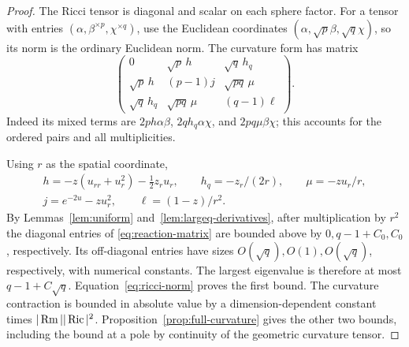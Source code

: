 \begin{proof}
The Ricci tensor is diagonal and scalar on each sphere factor. For a tensor
with entries \((\alpha,\beta^{\times p},\chi^{\times q})\), use the
Euclidean coordinates \((\alpha,\sqrt p\beta,\sqrt q\chi)\), so its
norm is the ordinary Euclidean norm. The curvature form has matrix
\begin{equation}\label{eq:reaction-matrix}
\begin{pmatrix}
0&\sqrt p\,h&\sqrt q\,h_q\\
\sqrt p\,h&(p-1)j&\sqrt{pq}\,\mu\\
\sqrt q\,h_q&\sqrt{pq}\,\mu&(q-1)\ell
\end{pmatrix}.
\end{equation}
Indeed its mixed terms are \(2ph\alpha\beta\),
\(2qh_q\alpha\chi\), and \(2pq\mu\beta\chi\); this accounts for
the ordered pairs and all multiplicities.

Using \(r\) as the spatial coordinate,
\begin{equation}\label{eq:curv-sideways}
\begin{gathered}
h=-z(u_{rr}+u_r^2)-\tfrac12z_ru_r,
\qquad h_q=-z_r/(2r),\qquad \mu=-zu_r/r,\\
j=e^{-2u}-zu_r^2,\qquad \ell=(1-z)/r^2.
\end{gathered}
\end{equation}
By Lemmas~\ref{lem:uniform} and~\ref{lem:largeq-derivatives}, after
multiplication by \(r^2\) the diagonal entries of
\eqref{eq:reaction-matrix} are bounded above by
\(0,q-1+C_0,C_0\), respectively. Its off-diagonal entries have sizes
\(O(\sqrt q),O(1),O(\sqrt q)\), respectively, with numerical constants.
The largest eigenvalue is therefore at most \(q-1+C\sqrt q\).
Equation~\eqref{eq:ricci-norm} proves the first bound.
The curvature contraction is bounded in absolute value by a
dimension-dependent constant times \(|\operatorname{Rm}||\operatorname{Ric}|^2\).
Proposition~\ref{prop:full-curvature} gives the other two bounds, including
the bound at a pole by continuity of the geometric curvature tensor.
\end{proof}
